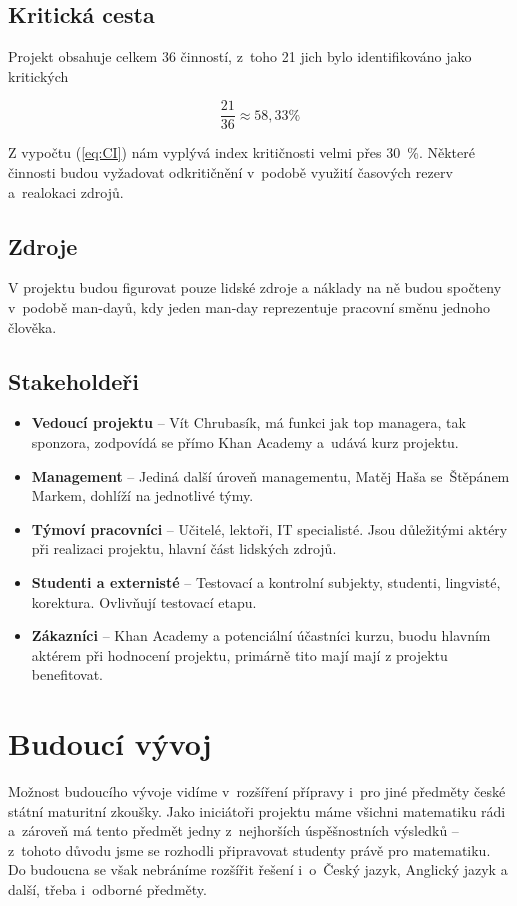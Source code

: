\documentclass[12pt, a4paper]{report}
\begin{document}
\section{Kritická cesta}
\label{sec:orga55e7c7}
Projekt obsahuje celkem 36 činností, z toho 21 jich bylo identifi\-kováno jako
kritických

\begin{equation}
\label{eq:orgb4012fc}
 \frac{21}{36} \approx 58,33 \%
\end{equation}

Z vypočtu (\ref{eq:CI}) nám vyplývá index kritičnosti velmi přes 30 \%. Některé
činnosti budou vyžadovat odkritičnění v podobě využití časových rezerv
a realokaci zdrojů.

\section{Zdroje}
\label{sec:orgf09e652}
V projektu budou figurovat pouze lidské zdroje a náklady na ně budou spočteny
v podobě man-dayů, kdy jeden man-day reprezentuje pracovní směnu jednoho
člověka.


\section{Stakeholdeři}
\label{sec:orgd9ad19a}
\begin{itemize}
\item \textbf{Vedoucí projektu} -- Vít Chrubasík, má funkci jak top managera, tak
sponzora, zodpovídá se přímo Khan Academy a udává kurz projektu.
\item \textbf{Management} -- Jediná další úroveň managementu, Matěj Haša se Štěpánem
Markem, dohlíží na jednotlivé týmy.
\item \textbf{Týmoví pracovníci} -- Učitelé, lektoři, IT specialisté. Jsou důležitými
aktéry při realizaci projektu, hlavní část lidských zdrojů.
\item \textbf{Studenti a externisté} -- Testovací a kontrolní subjekty, studenti,
lingvisté, korektura. Ovlivňují testovací etapu.
\item \textbf{Zákazníci} -- Khan Academy a potenciální účastníci kurzu, buodu hlavním
aktérem při hodnocení projektu, primárně tito mají mají z projektu
benefitovat.
\end{itemize}


\chapter{Budoucí vývoj}
\label{sec:org09c777c}
Možnost budoucího vývoje vidíme v rozšíření přípravy i pro jiné předměty české
státní maturitní zkoušky. Jako iniciátoři projektu máme všichni matematiku rádi
a zároveň má tento předmět jedny z nejhorších úspěšnostních výsledků -- z tohoto
důvodu jsme se rozhodli připravovat studenty právě pro matematiku. Do budoucna
se však nebráníme rozšířit řešení i o Český jazyk, Anglický jazyk a další, třeba
i odborné předměty.
\end{document}
